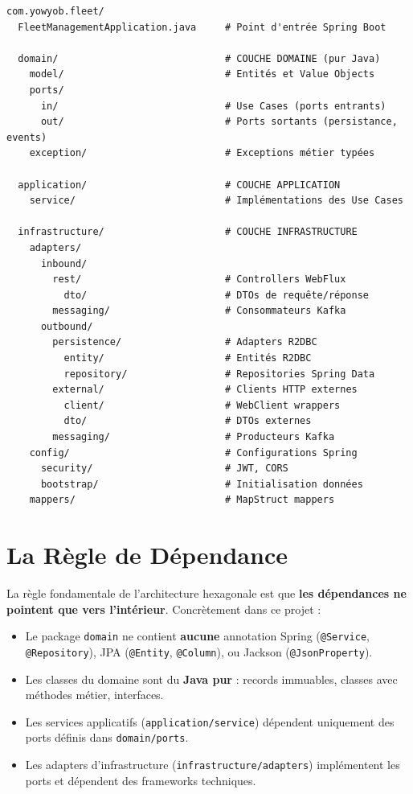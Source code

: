 \documentclass[12pt,a4paper]{report}
\begin{document}
\begin{lstlisting}[style=yamlStyle, caption={Structure des packages Java}]
com.yowyob.fleet/
  FleetManagementApplication.java     # Point d'entrée Spring Boot

  domain/                             # COUCHE DOMAINE (pur Java)
    model/                            # Entités et Value Objects
    ports/
      in/                             # Use Cases (ports entrants)
      out/                            # Ports sortants (persistance, events)
    exception/                        # Exceptions métier typées

  application/                        # COUCHE APPLICATION
    service/                          # Implémentations des Use Cases

  infrastructure/                     # COUCHE INFRASTRUCTURE
    adapters/
      inbound/
        rest/                         # Controllers WebFlux
          dto/                        # DTOs de requête/réponse
        messaging/                    # Consommateurs Kafka
      outbound/
        persistence/                  # Adapters R2DBC
          entity/                     # Entités R2DBC
          repository/                 # Repositories Spring Data
        external/                     # Clients HTTP externes
          client/                     # WebClient wrappers
          dto/                        # DTOs externes
        messaging/                    # Producteurs Kafka
    config/                           # Configurations Spring
      security/                       # JWT, CORS
      bootstrap/                      # Initialisation données
    mappers/                          # MapStruct mappers
\end{lstlisting}

\section{La Règle de Dépendance}

La règle fondamentale de l'architecture hexagonale est que \textbf{les dépendances ne pointent que vers l'intérieur}. Concrètement dans ce projet :

\begin{itemize}[leftmargin=2cm]
  \item Le package \texttt{domain} ne contient \textbf{aucune} annotation Spring (\texttt{@Service}, \texttt{@Repository}), JPA (\texttt{@Entity}, \texttt{@Column}), ou Jackson (\texttt{@JsonProperty}).
  \item Les classes du domaine sont du \textbf{Java pur} : records immuables, classes avec méthodes métier, interfaces.
  \item Les services applicatifs (\texttt{application/service}) dépendent uniquement des ports définis dans \texttt{domain/ports}.
  \item Les adapters d'infrastructure (\texttt{infrastructure/adapters}) implémentent les ports et dépendent des frameworks techniques.
\end{itemize}
\end{document}
